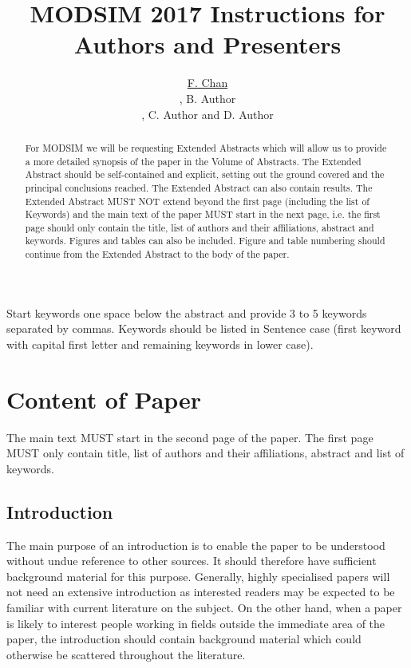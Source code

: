 \documentclass[a4paper,fleqn]{article} %
\title{MODSIM 2017 Instructions for Authors and Presenters} %
\author{\underline{F. Chan} %
\address[A1]{\it{Curtin University, GPO BOX U1987, Perth, Western Australia, 6845 }}, B. Author \address[B1]{\it{B affiliation, GPO Box 987, Somewhere else, SomeCountry}}, C. Author \addressmark[A1] and D. Author \addressmark[B1]
}
\begin{document}
\begin{abstract}
For MODSIM we will be requesting Extended Abstracts which will allow us to provide a more detailed synopsis of the paper in the Volume of Abstracts. The Extended Abstract should be self-contained and explicit, setting out the ground covered and the principal conclusions reached. The Extended Abstract can also contain results. The Extended Abstract MUST NOT extend beyond the first page (including the list of Keywords) and the main text of the paper MUST start in the next page, i.e. the first page should only contain the title, list of authors and their affiliations, abstract and keywords. Figures and tables can also be included. Figure and table numbering should continue from the Extended Abstract to the body of the paper.
\end{abstract}

\begin{keyword}
Start keywords one space below the abstract and provide 3 to 5 keywords separated by commas. Keywords should be listed in Sentence case (first keyword with capital first letter and remaining keywords in lower case).
\end{keyword}

\maketitle

\section{Content of Paper}

The main text MUST start in the second page of the paper. The first page MUST only contain title, list of authors and their affiliations, abstract and list of keywords.

\subsection{Introduction}

The main purpose of an introduction is to enable the paper to be understood without undue reference to other sources.  It should therefore have sufficient background material for this purpose.  Generally, highly specialised papers will not need an extensive introduction as interested readers may be expected to be familiar with current literature on the subject.  On the other hand, when a paper is likely to interest people working in fields outside the immediate area of the paper, the introduction should contain background material which could otherwise be scattered throughout the literature.
\end{document}

